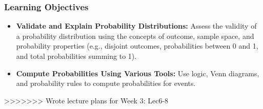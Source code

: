     \begin{frame}
    \frametitle{Learning Objectives}
    \begin{itemize}
        \item \textbf{Validate and Explain Probability Distributions:} Assess the validity of a probability distribution using the concepts of outcome, sample space, and probability properties (e.g., disjoint outcomes, probabilities between 0 and 1, and total probabilities summing to 1).
        \item \textbf{Compute Probabilities Using Various Tools:} Use logic, Venn diagrams, and probability rules to compute probabilities for events.
    \end{itemize}
    \end{frame}
>>>>>>> Wrote lecture plans for Week 3: Lec6-8
